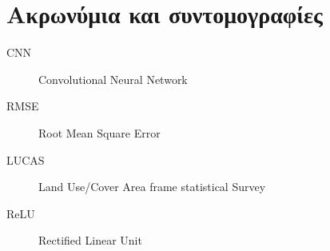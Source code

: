 \chapter{Ακρωνύμια και συντομογραφίες}

\begin{description}
    \item[CNN] Convolutional Neural Network
    \item[RMSE] Root Mean Square Error
    \item[LUCAS] Land Use/Cover Area frame statistical Survey
    \item[ReLU] Rectified Linear Unit
    \item[] 
\end{description}
